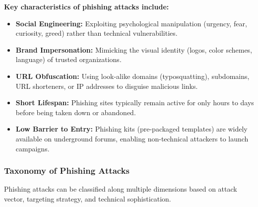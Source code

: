\textbf{Key characteristics of phishing attacks include:}

\begin{itemize}
\item
  \textbf{Social Engineering:} Exploiting psychological manipulation
  (urgency, fear, curiosity, greed) rather than technical
  vulnerabilities.
\item
  \textbf{Brand Impersonation:} Mimicking the visual identity (logos,
  color schemes, language) of trusted organizations.
\item
  \textbf{URL Obfuscation:} Using look-alike domains (typosquatting),
  subdomains, URL shorteners, or IP addresses to disguise malicious
  links.
\item
  \textbf{Short Lifespan:} Phishing sites typically remain active for
  only hours to days before being taken down or abandoned.
\item
  \textbf{Low Barrier to Entry:} Phishing kits (pre-packaged templates)
  are widely available on underground forums, enabling non-technical
  attackers to launch campaigns.
\end{itemize}

\subsubsection{Taxonomy of Phishing
Attacks}\label{taxonomy-of-phishing-attacks}

Phishing attacks can be classified along multiple dimensions based on
attack vector, targeting strategy, and technical sophistication.

